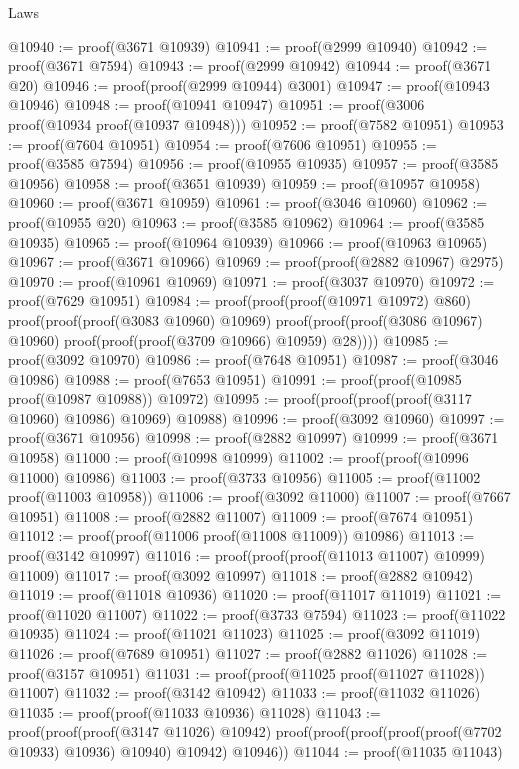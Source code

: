 \begin{lexlean}{Laws}
\begin{coremodule}
@10940 := proof(@3671 @10939)
@10941 := proof(@2999 @10940)
@10942 := proof(@3671 @7594)
@10943 := proof(@2999 @10942)
@10944 := proof(@3671 @20)
@10946 := proof(proof(@2999 @10944) @3001)
@10947 := proof(@10943 @10946)
@10948 := proof(@10941 @10947)
@10951 := proof(@3006 proof(@10934 proof(@10937 @10948)))
@10952 := proof(@7582 @10951)
@10953 := proof(@7604 @10951)
@10954 := proof(@7606 @10951)
@10955 := proof(@3585 @7594)
@10956 := proof(@10955 @10935)
@10957 := proof(@3585 @10956)
@10958 := proof(@3651 @10939)
@10959 := proof(@10957 @10958)
@10960 := proof(@3671 @10959)
@10961 := proof(@3046 @10960)
@10962 := proof(@10955 @20)
@10963 := proof(@3585 @10962)
@10964 := proof(@3585 @10935)
@10965 := proof(@10964 @10939)
@10966 := proof(@10963 @10965)
@10967 := proof(@3671 @10966)
@10969 := proof(proof(@2882 @10967) @2975)
@10970 := proof(@10961 @10969)
@10971 := proof(@3037 @10970)
@10972 := proof(@7629 @10951)
@10984 := proof(proof(proof(@10971 @10972) @860)
      proof(proof(proof(@3083 @10960) @10969)
          proof(proof(proof(@3086 @10967) @10960) proof(proof(proof(@3709 @10966) @10959) @28))))
@10985 := proof(@3092 @10970)
@10986 := proof(@7648 @10951)
@10987 := proof(@3046 @10986)
@10988 := proof(@7653 @10951)
@10991 := proof(proof(@10985 proof(@10987 @10988)) @10972)
@10995 := proof(proof(proof(proof(@3117 @10960) @10986) @10969) @10988)
@10996 := proof(@3092 @10960)
@10997 := proof(@3671 @10956)
@10998 := proof(@2882 @10997)
@10999 := proof(@3671 @10958)
@11000 := proof(@10998 @10999)
@11002 := proof(proof(@10996 @11000) @10986)
@11003 := proof(@3733 @10956)
@11005 := proof(@11002 proof(@11003 @10958))
@11006 := proof(@3092 @11000)
@11007 := proof(@7667 @10951)
@11008 := proof(@2882 @11007)
@11009 := proof(@7674 @10951)
@11012 := proof(proof(@11006 proof(@11008 @11009)) @10986)
@11013 := proof(@3142 @10997)
@11016 := proof(proof(proof(@11013 @11007) @10999) @11009)
@11017 := proof(@3092 @10997)
@11018 := proof(@2882 @10942)
@11019 := proof(@11018 @10936)
@11020 := proof(@11017 @11019)
@11021 := proof(@11020 @11007)
@11022 := proof(@3733 @7594)
@11023 := proof(@11022 @10935)
@11024 := proof(@11021 @11023)
@11025 := proof(@3092 @11019)
@11026 := proof(@7689 @10951)
@11027 := proof(@2882 @11026)
@11028 := proof(@3157 @10951)
@11031 := proof(proof(@11025 proof(@11027 @11028)) @11007)
@11032 := proof(@3142 @10942)
@11033 := proof(@11032 @11026)
@11035 := proof(proof(@11033 @10936) @11028)
@11043 := proof(proof(proof(@3147 @11026) @10942)
      proof(proof(proof(proof(proof(@7702 @10933) @10936) @10940) @10942) @10946))
@11044 := proof(@11035 @11043)

\end{coremodule}
\end{lexlean}
